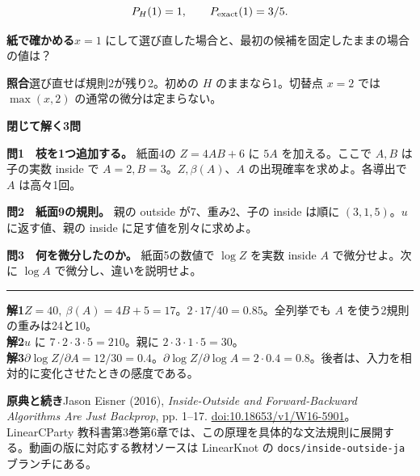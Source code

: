 \documentclass[a5paper,10pt]{ltjsarticle}
\newcommand{\unit}[2]{\clearpage{\small 動画①　#1}\par{\Large\bfseries #2}\par\medskip}
\newcommand{\task}[1]{\par\medskip\textbf{紙で確かめる}\quad #1}
\newcommand{\ans}[1]{\par\textbf{照合}\quad #1}
\begin{document}
\[
P_H(1)=1,\qquad P_{\rm exact}(1)=3/5.
\]
\task{$x=1$ にして選び直した場合と、最初の候補を固定したままの場合の値は？}
\ans{選び直せば規則2が残り2。初めの $H$ のままなら1。切替点 $x=2$ では $\max(x,2)$ の通常の微分は定まらない。}
\unit{通覧後}{閉じて解く3問}
\textbf{問1　枝を1つ追加する。} 紙面4の $Z=4AB+6$ に $5A$ を加える。ここで $A,B$ は子の実数 inside で $A=2,B=3$。$Z,\beta(A)$、$A$ の出現確率を求めよ。各導出で $A$ は高々1回。
\par\textbf{問2　紙面9の規則。} 親の outside が7、重み2、子の inside は順に $(3,1,5)$。$u$ に返す値、親の inside に足す値を別々に求めよ。
\par\textbf{問3　何を微分したのか。} 紙面5の数値で $\log Z$ を実数 inside $A$ で微分せよ。次に $\log A$ で微分し、違いを説明せよ。
\par\medskip\hrule\medskip
\textbf{解1}\quad $Z=40,\ \beta(A)=4B+5=17$。$2\cdot17/40=0.85$。全列挙でも $A$ を使う2規則の重みは24と10。\\
\textbf{解2}\quad $u$ に $7\cdot2\cdot3\cdot5=210$。親に $2\cdot3\cdot1\cdot5=30$。\\
\textbf{解3}\quad $\partial\log Z/\partial A=12/30=0.4$。$\partial\log Z/\partial\log A=2\cdot0.4=0.8$。後者は、入力を相対的に変化させたときの感度である。
\par\medskip
\textbf{原典と続き}\quad Jason Eisner (2016), \emph{Inside-Outside and Forward-Backward Algorithms Are Just Backprop}, pp. 1--17. \href{https://aclanthology.org/W16-5901/}{doi:10.18653/v1/W16-5901}。LinearCParty 教科書第3巻第6章では、この原理を具体的な文法規則に展開する。動画の版に対応する教材ソースは LinearKnot の \texttt{docs/inside-outside-ja} ブランチにある。
\end{document}

